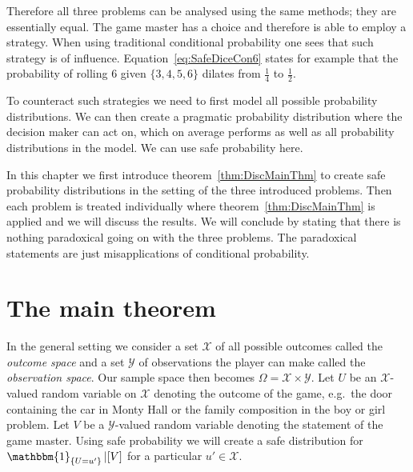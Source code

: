 \documentclass[twoside,a4paper]{report}
\theoremstyle{plain}
\theoremstyle{definition}
\theoremstyle{remark}
\numberwithin{equation}{chapter}
\DeclareMathOperator{\1}{\mathbbm{1}}
\newcommand{\X}{\mathcal{X}}
\newcommand{\Y}{\mathcal{Y}}
\begin{document}
Therefore all three problems can be analysed using the same methods; they are essentially equal. The game master has a choice and therefore is able to employ a strategy. When using traditional conditional probability one sees that such strategy is of influence. Equation~\ref{eq:SafeDiceCon6} states for example that the probability of rolling $6$ given $\{3,4,5,6\}$ dilates from $\frac{1}{4}$ to $\frac{1}{2}$.

To counteract such strategies we need to first model all possible probability distributions. We can then create a pragmatic probability distribution where the decision maker can act on, which on average performs as well as all probability distributions in the model. We can use safe probability here.

In this chapter we first introduce theorem~\ref{thm:DiscMainThm} to create safe probability distributions in the setting of the three introduced problems. Then each problem is treated individually where theorem~\ref{thm:DiscMainThm} is applied and we will discuss the results. We will conclude by stating that there is nothing paradoxical going on with the three problems. The paradoxical statements are just misapplications of conditional probability.

\section{The main theorem}
In the general setting we consider a set $\X$ of all possible outcomes called the \emph{outcome space} and a set $\Y$ of observations the player can make called the \emph{observation space}. Our sample space then becomes $\Omega=\X\times\Y$. Let $U$ be an $\X$-valued random variable on $\X$ denoting the outcome of the game, e.g.~the door containing the car in Monty Hall or the family composition in the boy or girl problem. Let $V$ be a $\Y$-valued random variable denoting the statement of the game master. Using safe probability we will create a safe distribution for $\1_{\{U=u'\}}|[V]$ for a particular $u'\in\X$.
\end{document}

